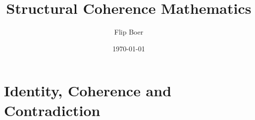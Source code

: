 \documentclass[12pt, oneside]{book}
\title{Structural Coherence Mathematics}
\author{Flip Boer}
\date{\today}
\theoremstyle{definition}
\theoremstyle{definition}
\begin{document}
\maketitle
\tableofcontents

\part{Identity, Coherence and Contradiction}





\appendix
\end{document}
